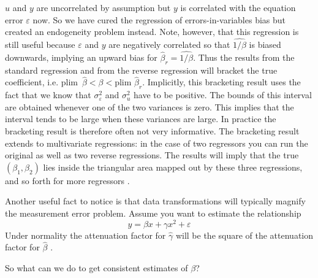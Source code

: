 \documentclass[12pt]{article}
\begin{document}
$u$ and $y$ are uncorrelated by assumption but $y$ is correlated with the equation error $\varepsilon$ now. So we have cured the regression of errors-in-variables bias but created an endogeneity problem instead. Note, however, that this regression is still useful because $\varepsilon$ and $y$ are negatively correlated so that $\widehat{1/\beta}$ is biased downwards, implying an upward bias for $\hat{\beta}_r = \widehat{1/\beta}$. Thus the results from the standard regression and from the reverse regression will bracket the true coefficient, i.e. plim $\hat{\beta} < \beta < \text{plim } \hat{\beta}_r$. Implicitly, this bracketing result uses the fact that we know that $\sigma_{\varepsilon}^2$ and $\sigma_u^2$ have to be positive. The bounds of this interval are obtained whenever one of the two variances is zero. This implies that the interval tends to be large when these variances are large. In practice the bracketing result is therefore often not very informative. The bracketing result extends to multivariate regressions: in the case of two regressors you can run the original as well as two reverse regressions. The results will imply that the true $(\beta_1, \beta_2)$ lies inside the triangular area mapped out by these three regressions, and so forth for more regressors \cite{Klepper_Leamer_1984}.

Another useful fact to notice is that data transformations will typically magnify the measurement error problem. Assume you want to estimate the relationship
\[
y = \beta x + \gamma x^2 + \varepsilon
\]
Under normality the attenuation factor for $\hat{\gamma}$ will be the square of the attenuation factor for $\hat{\beta}$ \cite{Griliches_1986}.

So what can we do to get consistent estimates of $\beta$?
\end{document}
